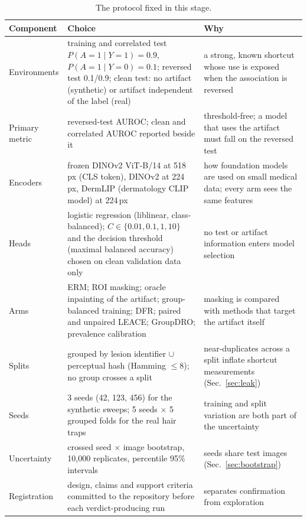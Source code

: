 \begin{table}[H]\centering\scriptsize
\caption{The protocol fixed in this stage.}\label{tab:protocol}
\begin{tabular}{p{2.2cm}p{7.8cm}p{5.0cm}}\toprule
Component & Choice & Why \\\midrule
Environments & training and correlated test $P(A{=}1\mid Y{=}1)=0.9$, $P(A{=}1\mid Y{=}0)=0.1$; reversed test 0.1/0.9; clean test: no artifact (synthetic) or artifact independent of the label (real) & a strong, known shortcut whose use is exposed when the association is reversed \\
Primary metric & reversed-test AUROC; clean and correlated AUROC reported beside it & threshold-free; a model that uses the artifact must fall on the reversed test \\
Encoders & frozen DINOv2 ViT-B/14 at 518\,px (CLS token), DINOv2 at 224\,px, DermLIP (dermatology CLIP model) at 224\,px & how foundation models are used on small medical data; every arm sees the same features \\
Heads & logistic regression (liblinear, class-balanced); $C\in\{0.01,0.1,1,10\}$ and the decision threshold (maximal balanced accuracy) chosen on clean validation data only & no test or artifact information enters model selection \\
Arms & ERM; ROI masking; oracle inpainting of the artifact; group-balanced training; DFR; paired and unpaired LEACE; GroupDRO; prevalence calibration & masking is compared with methods that target the artifact itself \\
Splits & grouped by lesion identifier $\cup$ perceptual hash (Hamming $\le 8$); no group crosses a split & near-duplicates across a split inflate shortcut measurements (Sec.~\ref{sec:leak}) \\
Seeds & 3 seeds (42, 123, 456) for the synthetic sweeps; 5 seeds $\times$ 5 grouped folds for the real hair traps & training and split variation are both part of the uncertainty \\
Uncertainty & crossed seed $\times$ image bootstrap, 10,000 replicates, percentile 95\% intervals & seeds share test images (Sec.~\ref{sec:bootstrap}) \\
Registration & design, claims and support criteria committed to the repository before each verdict-producing run & separates confirmation from exploration \\
\bottomrule\end{tabular}
\end{table}

